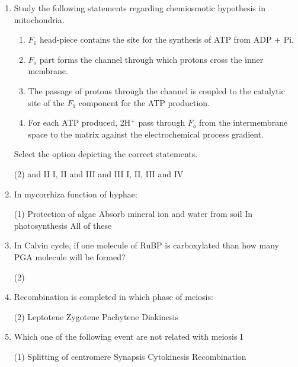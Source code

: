 \documentclass[twocolumn]{article}
\begin{document}
\begin{enumerate}
    \item Study the following statements regarding chemiosmotic hypothesis in mitochondria.
    \begin{enumerate}
        \item \(F_1\) head-piece contains the site for the synthesis of ATP from ADP + Pi.
        \item \(F_o\) part forms the channel through which protons cross the inner membrane.
        \item The passage of protons through the channel is coupled to the catalytic site of the \(F_1\) component for the ATP production.
        \item For each ATP produced, 2H\(^+\) pass through \(F_o\) from the intermembrane space to the matrix against the electrochemical process gradient.
    \end{enumerate}
    Select the option depicting the correct statements.
    \begin{tasks}(2)
         and II
        \task I, II and III
         and III
        \task I, II, III and IV
    \end{tasks}

    \item In mycorrhiza function of hyphae:
    \begin{tasks}(1)
        \task Protection of algae
        \task Absorb mineral ion and water from soil
        \task In photosynthesis
        \task All of these
    \end{tasks}

    \item In Calvin cycle, if one molecule of RuBP is carboxylated than how many PGA molecule will be formed?
    \begin{tasks}(2)
    \end{tasks}

    \item Recombination is completed in which phase of meiosis:
    \begin{tasks}(2)
        \task Leptotene
        \task Zygotene
        \task Pachytene
        \task Diakinesis
    \end{tasks}

    \item Which one of the following event are not related with meiosis I
    \begin{tasks}(1)
        \task Splitting of centromere
        \task Synapsis
        \task Cytokinesis
        \task Recombination
    \end{tasks}


\end{enumerate}
\end{document}
